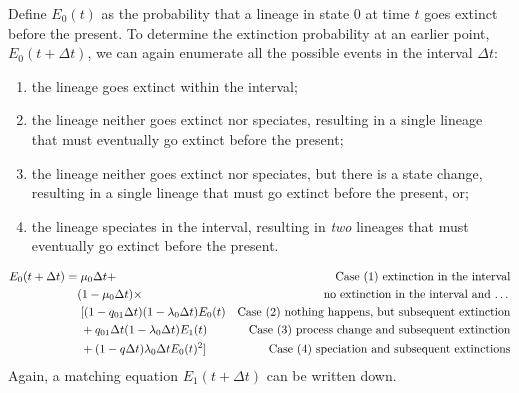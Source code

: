 Define $E_0(t)$ as the probability that a lineage in state 0 at time $t$ goes extinct before the present.
To determine the extinction probability at an earlier point, $E_0(t+\Delta t)$, we can again enumerate all the possible events in the interval $\Delta t$:
\begin{enumerate}
	\item the lineage goes extinct within the interval;
	\item the lineage neither goes extinct nor speciates, resulting in a single lineage that must eventually go extinct before the present;
	\item the lineage neither goes extinct nor speciates, but there is a state change, resulting in a single lineage that must go extinct before the present, or;
	\item the lineage speciates in the interval, resulting in \emph{two} lineages that must eventually go extinct before the present.
\end{enumerate}

\begin{align}
	E_0(t + \Delta t) = &\; \mu_0\Delta t +	& \text{Case (1) extinction in the interval} \label{equation:ExtDeltaT}\\
				     & (1 - \mu_0\Delta t) \times & \text{no extinction in the interval and \dots} \nonumber\\
				     & \;[(1-q_{01}\Delta t)(1-\lambda_0\Delta t)E_0(t) & \text{Case (2) nothing happens, but subsequent extinction} \nonumber\\
				     & \;+ q_{01}\Delta t (1-\lambda_0\Delta t)E_1(t) & \text{Case (3) process change and subsequent extinction} \nonumber\\
				     & \;+ (1 - q\Delta t) \lambda_0\Delta t E_0(t)^2] & \text{Case (4) speciation and subsequent extinctions} \nonumber
\end{align}
Again, a matching equation $E_1(t+\Delta t)$ can be written down.

